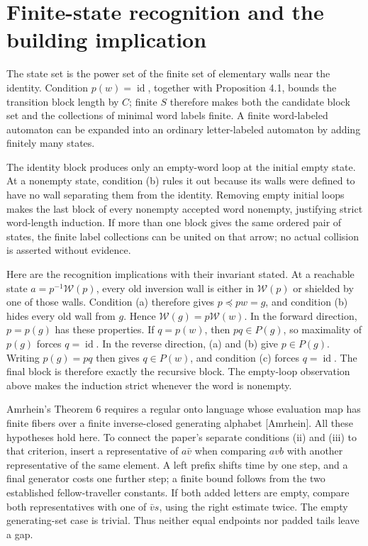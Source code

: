 \documentclass[10pt]{article}
\begin{document}
\section*{Finite-state recognition and the building implication}
The state set is the power set of the finite set of elementary walls near the identity. Condition \(p(w)=\operatorname{id}\), together with Proposition 4.1, bounds the transition block length by \(C\); finite \(S\) therefore makes both the candidate block set and the collections of minimal word labels finite. A finite word-labeled automaton can be expanded into an ordinary letter-labeled automaton by adding finitely many states.\par
The identity block produces only an empty-word loop at the initial empty state. At a nonempty state, condition (b) rules it out because its walls were defined to have no wall separating them from the identity. Removing empty initial loops makes the last block of every nonempty accepted word nonempty, justifying strict word-length induction. If more than one block gives the same ordered pair of states, the finite label collections can be united on that arrow; no actual collision is asserted without evidence.\par
Here are the recognition implications with their invariant stated. At a reachable state \(a=p^{-1}\mathcal W(p)\), every old inversion wall is either in \(\mathcal W(p)\) or shielded by one of those walls. Condition (a) therefore gives \(p\preceq pw=g\), and condition (b) hides every old wall from \(g\). Hence \(\mathcal W(g)=p\mathcal W(w)\). In the forward direction, \(p=p(g)\) has these properties. If \(q=p(w)\), then \(pq\in P(g)\), so maximality of \(p(g)\) forces \(q=\operatorname{id}\). In the reverse direction, (a) and (b) give \(p\in P(g)\). Writing \(p(g)=pq\) then gives \(q\in P(w)\), and condition (c) forces \(q=\operatorname{id}\). The final block is therefore exactly the recursive block. The empty-loop observation above makes the induction strict whenever the word is nonempty.\par
Amrhein’s Theorem 6 requires a regular onto language whose evaluation map has finite fibers over a finite inverse-closed generating alphabet [Amrhein]. All these hypotheses hold here. To connect the paper’s separate conditions (ii) and (iii) to that criterion, insert a representative of \(a\bar v\) when comparing \(avb\) with another representative of the same element. A left prefix shifts time by one step, and a final generator costs one further step; a finite bound follows from the two established fellow-traveller constants. If both added letters are empty, compare both representatives with one of \(\bar v s\), using the right estimate twice. The empty generating-set case is trivial. Thus neither equal endpoints nor padded tails leave a gap.\par
\end{document}
